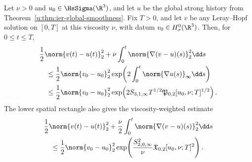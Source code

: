 \begin{theorem}
\label{u:thm:app-relative-energy}
Let \(\nu>0\) and \(u_0\in\HsSigma(\R^3)\), and let \(u\) be the global strong history
from Theorem~\ref{u:thm:ier-global-smoothness}.  Fix \(T>0\), and let \(v\) be
any Leray--Hopf solution on \([0,T]\) at this viscosity \(\nu\), with
datum \(v_0\in H^0_\sigma(\R^3)\).  Then, for \(0\le t\le T\),
\begin{align}
 &\frac12\norm{v(t)-u(t)}_2^2
 +\nu\int_0^t\norm{\nabla(v-u)(s)}_2^2\dd s
 \notag\\
 &\quad\le
 \frac12\norm{v_0-u_0}_2^2
 \exp\!\left(
 2\int_0^t\norm{\nabla u(s)}_\infty\dd s
 \right)
 \label{u:eq:app-relative-energy-action}\\
 &\quad\le
 \frac12\norm{v_0-u_0}_2^2
 \exp\!\left(
 2S_{3,1,\infty}T^{1/2}
 \mathfrak P_{0,2}[u_0,\nu;T]^{1/2}
 \right).
 \label{u:eq:app-relative-energy-producer}
\end{align}
The lower spatial rectangle also gives the viscosity-weighted estimate
\begin{align}
 &\frac12\norm{v(t)-u(t)}_2^2
 +\frac\nu2\int_0^t\norm{\nabla(v-u)(s)}_2^2\dd s
 \notag\\
 &\quad\le
 \frac12\norm{v_0-u_0}_2^2
 \exp\!\left(
 \frac{S_{2,0,\infty}^2}{\nu}
 \mathfrak X_{0,2}[u_0,\nu;T]^2
 \right).
 \label{u:eq:app-relative-energy-low-rectangle}
\end{align}
\end{theorem}

